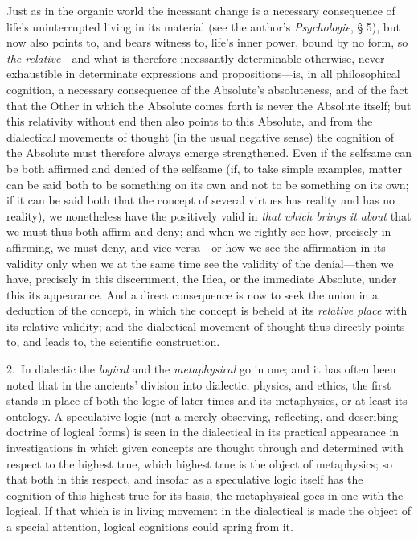 \documentclass[12pt,a4paper]{book}
\begin{document}
Just as in the organic world the incessant change is a necessary consequence of life's
uninterrupted living in its material (see the author's \textit{Psychologie}, § 5), but
now also points to, and bears witness to, life's inner power, bound by no form, so
\emph{the relative}---and what is therefore incessantly determinable otherwise, never
exhaustible in determinate expressions and propositions---is, in all philosophical
cognition, a necessary consequence of the Absolute's absoluteness, and of the fact that
the Other in which the Absolute comes forth is never the Absolute itself; but this
relativity without end then also points to this Absolute, and from the dialectical
movements of thought (in the usual negative sense) the cognition of the Absolute must
therefore always emerge strengthened. Even if the selfsame can be both affirmed and
denied of the selfsame (if, to take simple examples, matter can be said both to be
something on its own and not to be something on its own; if it can be said both that the
concept of several virtues has reality and has no reality), we nonetheless have the
positively valid in \emph{that which brings it about} that we must thus both affirm and deny;
and when we rightly see how, precisely in affirming, we must deny, and vice versa---or
how we see the affirmation in its validity only when we at the same time see the
validity of the denial---then we have, precisely in this discernment, the Idea, or the
immediate Absolute, under this its appearance. And a direct consequence is now to seek
the union in a deduction of the concept, in which the concept is beheld at its
\emph{relative place} with its relative validity; and the dialectical movement of
thought thus directly points to, and leads to, the scientific construction.

2.~In dialectic the \emph{logical} and the \emph{metaphysical} go in one; and it has
often been noted that in the ancients' division into dialectic, physics, and ethics, the
first stands in place of both the logic of later times and its metaphysics, or at least
its ontology. A speculative logic (not a merely observing, reflecting, and describing
doctrine of logical forms) is seen in the dialectical in its practical appearance in
investigations in which given concepts are thought through and determined with respect
to the highest true, which highest true is the object of metaphysics; so that both in
this respect, and insofar as a speculative logic itself has the cognition of this
highest true for its basis, the metaphysical goes in one with the logical. If that which
is in living movement in the dialectical is made the object of a special attention,
logical cognitions could spring from it.
\end{document}
